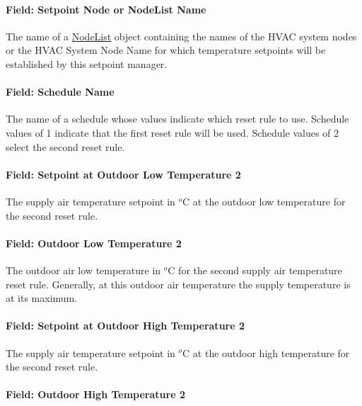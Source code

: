 \paragraph{Field: Setpoint Node or NodeList Name}\label{field-setpoint-node-or-nodelist-name-2}

The name of a \hyperref[nodelist]{NodeList} object containing the names of the HVAC system nodes or the HVAC System Node Name for which temperature setpoints will be established by this setpoint manager.

\paragraph{Field: Schedule Name}\label{field-schedule-name-1-002}

The name of a schedule whose values indicate which reset rule to use. Schedule values of 1 indicate that the first reset rule will be used. Schedule values of 2 select the second reset rule.

\paragraph{Field: Setpoint at Outdoor Low Temperature 2}\label{field-setpoint-at-outdoor-low-temperature-2}

The supply air temperature setpoint in \(^{o}\)C at the outdoor low temperature for the second reset rule.

\paragraph{Field: Outdoor Low Temperature 2}\label{field-outdoor-low-temperature-2}

The outdoor air low temperature in \(^{o}\)C for the second supply air temperature reset rule. Generally, at this outdoor air temperature the supply temperature is at its maximum.

\paragraph{Field: Setpoint at Outdoor High Temperature 2}\label{field-setpoint-at-outdoor-high-temperature-2}

The supply air temperature setpoint in \(^{o}\)C at the outdoor high temperature for the second reset rule.

\paragraph{Field: Outdoor High Temperature 2}\label{field-outdoor-high-temperature-2}

